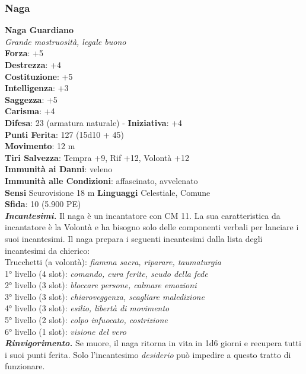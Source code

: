 \begin{multicols}{2}
\subsubsection{Naga}

\medskip\textbf{Naga Guardiano}\\
\emph{Grande mostruosità, legale buono}\\
\textbf{Forza}: +5\\
\textbf{Destrezza}: +4\\
\textbf{Costituzione}: +5\\
\textbf{Intelligenza}: +3\\
\textbf{Saggezza}: +5\\
\textbf{Carisma}: +4\\
\textbf{Difesa}: 23 (armatura naturale) - \textbf{Iniziativa}: +4\\
\textbf{Punti Ferita}: 127 (15d10 + 45)\\
\textbf{Movimento}: 12 m\\
\textbf{Tiri Salvezza}: Tempra +9, Rif +12, Volontà +12\\
\textbf{Immunità ai Danni}: veleno\\
\textbf{Immunità alle Condizioni}: affascinato, avvelenato\\
\textbf{Sensi} Scurovisione 18 m \textbf{Linguaggi} Celestiale, Comune\\
\textbf{Sfida}: 10 (5.900 PE)\smallskip\\
\emph{\textbf{Incantesimi.}} Il naga è un incantatore con CM 11. La sua caratteristica da incantatore è la Volontà e ha bisogno solo delle componenti verbali per lanciare i suoi incantesimi. Il naga prepara i seguenti incantesimi dalla lista degli incantesimi da chierico:\\
Trucchetti (a volontà): \emph{fiamma sacra, riparare, taumaturgia}\\
1° livello (4 slot): \emph{comando, cura ferite, scudo della fede}\\
2° livello (3 slot): \emph{bloccare persone, calmare emozioni}\\
3° livello (3 slot): \emph{chiaroveggenza, scagliare maledizione}\\
4° livello (3 slot): \emph{esilio, libertà di movimento}\\
5° livello (2 slot): \emph{colpo infuocato, costrizione}\\
6° livello (1 slot): \emph{visione del vero}\\
\emph{\textbf{Rinvigorimento.}} Se muore, il naga ritorna in vita in 1d6 giorni e recupera tutti i suoi punti ferita. Solo l'incantesimo \emph{desiderio} può impedire a questo tratto di funzionare.\\

\end{multicols}
